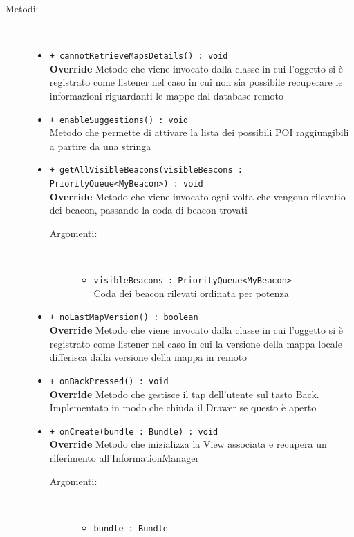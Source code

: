 \documentclass[../DefinizioneDiProdotto.tex]{subfiles}
\begin{document}
\begin{description}
\begin{itemize}
	\end{itemize}
	\item[Metodi:] \
	\begin{itemize}
		\item \texttt{+ cannotRetrieveMapsDetails() : void}\\
		\textbf{Override} Metodo che viene invocato dalla classe in cui l'oggetto si è registrato come listener nel caso in cui non sia possibile recuperare le informazioni riguardanti le mappe dal database remoto
		\item \texttt{+ enableSuggestions() : void}\\
		Metodo che permette di attivare la lista dei possibili POI raggiungibili a partire da una stringa
		\item \texttt{+ getAllVisibleBeacons(visibleBeacons : PriorityQueue<MyBeacon>) : void}\\
		\textbf{Override} Metodo che viene invocato ogni volta che vengono rilevatio dei beacon, passando la coda di beacon trovati
		\begin{description}
			\item[Argomenti:] \
			\begin{itemize}
				\item \texttt{visibleBeacons : PriorityQueue<MyBeacon>}\\
				Coda dei beacon rilevati ordinata per potenza\end{itemize}
		\end{description}
		\item \texttt{+ noLastMapVersion() : boolean}\\
		\textbf{Override} Metodo che viene invocato dalla classe in cui l'oggetto si è registrato come listener nel caso in cui la versione della mappa locale differisca dalla versione della mappa in remoto
		\item \texttt{+ onBackPressed() : void}\\
		\textbf{Override} Metodo che gestisce il tap dell'utente sul tasto Back. Implementato in modo che chiuda il Drawer se questo è aperto
		\item \texttt{+ onCreate(bundle : Bundle) : void}\\
		\textbf{Override} Metodo che inizializza la View associata e recupera un riferimento all'InformationManager
		\begin{description}
			\item[Argomenti:] \
			\begin{itemize}
				\item \texttt{bundle : Bundle}\\

\end{itemize}
\end{description}
\end{itemize}
\end{description}
\end{document}
